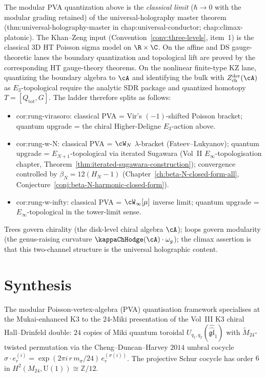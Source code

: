 \begin{remark}%
\label{rem:anchor-modular-pva-quantization}%
%
%
%
The modular PVA quantization above is the \emph{classical limit}
($\hbar \to 0$ with the modular grading retained) of the
universal-holography master theorem
(\textsf{thm:universal-holography-master} in
\textsf{chap:universal-conductor}; \textsf{chap:climax-platonic}).
The Khan--Zeng input
(Convention~\ref{conv:three-levels}, item~1) is the classical
3D HT Poisson sigma model on $\R \times \C$. On the affine and DS
gauge-theoretic lanes the boundary quantization and topological lift
are proved by the corresponding HT gauge-theory theorems. On the
nonlinear finite-type KZ lane, quantizing the boundary algebra to
$\cA$ and identifying the bulk with
$Z^{\mathrm{der}}_{\mathrm{ch}}(\cA)$ as $E_3$-topological require the
analytic SDR package and quantized homotopy
$T=[Q_{\mathrm{tot}},G]$. The ladder therefore splits as follows:
\begin{itemize}[nosep]
\item \textsf{cor:rung-virasoro}: classical PVA = Vir's
 $(-1)$-shifted Poisson bracket; quantum upgrade = the chiral
 Higher-Deligne $E_3$-action above.
\item \textsf{cor:rung-w-N}: classical PVA = $\cW_N$
 $\lambda$-bracket (Fateev--Lukyanov); quantum upgrade =
 $E_{N+1}$-topological via iterated Sugawara
 (Vol~II $E_\infty$-topologisation chapter,
 Theorem~\ref{thm:iterated-sugawara-construction}); convergence
 controlled by $\beta_N = 12(H_N - 1)$
 (Chapter~\ref{ch:beta-N-closed-form-all},
 Conjecture~\ref{conj:beta-N-harmonic-closed-form}).
\item \textsf{cor:rung-w-infty}: classical PVA = $\cW_\infty[\mu]$
 inverse limit; quantum upgrade = $E_\infty$-topological in the
 tower-limit sense.
\end{itemize}
Trees govern chirality (the disk-level chiral algebra $\cA$); loops
govern modularity (the genus-raising curvature
$\kappaChHodge(\cA) \cdot \omega_g$); the climax assertion is
that this two-channel structure is the universal holographic
content.
\end{remark}

\section{Synthesis}
\label{sec:mpva-core-supplement}

\begin{remark}
\label{rem:mpva-core-24-miki}
The modular Poisson-vertex-algebra (PVA) quantisation framework
specialises at the Mukai-enhanced K3 to the $24$-Miki presentation of
the Vol~III K3 chiral Hall--Drinfeld double: $24$ copies of Miki
quantum toroidal
$U_{q_1, q_2}(\widehat{\widehat{\mathfrak{gl}}}_1)$ with
$\widetilde{M}_{24}$-twisted permutation via the
Cheng--Duncan--Harvey $2014$ umbral cocycle
$\sigma \cdot e^{(i)}_r = \exp(2\pi i\, r\, m_\sigma / 24)\,
e^{(\sigma(i))}_r$. The projective Schur cocycle has order $6$ in
$H^2(M_{24}, \mathrm{U}(1)) \cong \mathbb{Z}/12$.
\end{remark}
